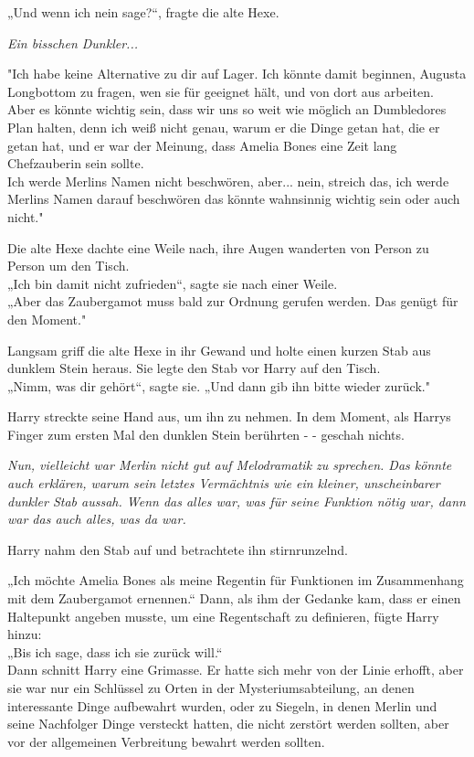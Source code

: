 {„Und wenn ich nein sage?“, fragte die alte Hexe.

\emph{Ein bisschen Dunkler...}

"Ich habe keine Alternative zu dir auf Lager. Ich könnte damit beginnen, Augusta Longbottom zu fragen, wen sie für geeignet hält, und von dort aus arbeiten.\\ Aber es könnte wichtig sein, dass wir uns so weit wie möglich an Dumbledores Plan halten, denn ich weiß nicht genau, warum er die Dinge getan hat, die er getan hat, und er war der Meinung, dass Amelia Bones eine Zeit lang Chefzauberin sein sollte.\\ Ich werde Merlins Namen nicht beschwören, aber... nein, streich das, ich werde Merlins Namen darauf beschwören das könnte wahnsinnig wichtig sein oder auch nicht."

Die alte Hexe dachte eine Weile nach, ihre Augen wanderten von Person zu Person um den Tisch.\\ „Ich bin damit nicht zufrieden“, sagte sie nach einer Weile.\\ „Aber das Zaubergamot muss bald zur Ordnung gerufen werden. Das genügt für den Moment."

Langsam griff die alte Hexe in ihr Gewand und holte einen kurzen Stab aus dunklem Stein heraus. Sie legte den Stab vor Harry auf den Tisch.\\ „Nimm, was dir gehört“, sagte sie. „Und dann gib ihn bitte wieder zurück."

Harry streckte seine Hand aus, um ihn zu nehmen. In dem Moment, als Harrys Finger zum ersten Mal den dunklen Stein berührten - - geschah nichts.

\emph{Nun, vielleicht war Merlin nicht gut auf Melodramatik zu sprechen. Das könnte auch erklären, warum sein letztes Vermächtnis wie ein kleiner, unscheinbarer dunkler Stab aussah. Wenn das alles war, was für seine Funktion nötig war, dann war das auch alles, was da war.}

Harry nahm den Stab auf und betrachtete ihn stirnrunzelnd.

„Ich möchte Amelia Bones als meine Regentin für Funktionen im Zusammenhang mit dem Zaubergamot ernennen.“ Dann, als ihm der Gedanke kam, dass er einen Haltepunkt angeben musste, um eine Regentschaft zu definieren, fügte Harry hinzu:\\ „Bis ich sage, dass ich sie zurück will.“\\ Dann schnitt Harry eine Grimasse. Er hatte sich mehr von der Linie erhofft, aber sie war nur ein Schlüssel zu Orten in der Mysteriumsabteilung, an denen interessante Dinge aufbewahrt wurden, oder zu Siegeln, in denen Merlin und seine Nachfolger Dinge versteckt hatten, die nicht zerstört werden sollten, aber vor der allgemeinen Verbreitung bewahrt werden sollten.

}

